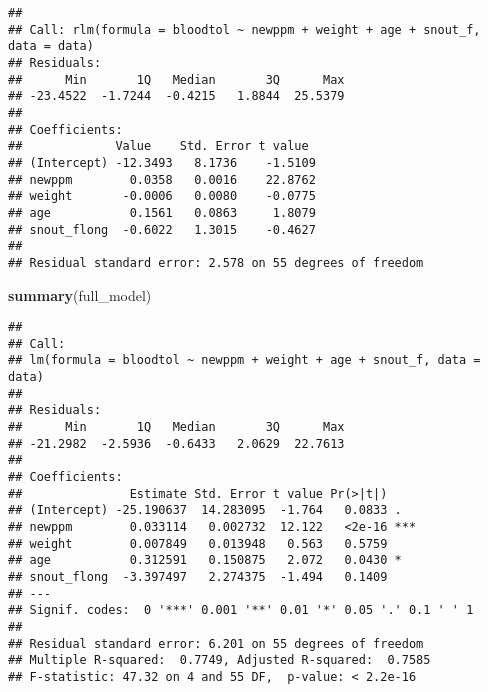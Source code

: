 \documentclass[
]{article}
\newenvironment{Shaded}{\begin{snugshade}}{\end{snugshade}}
\newcommand{\AttributeTok}[1]{\textcolor[rgb]{0.13,0.29,0.53}{#1}}
\newcommand{\CommentTok}[1]{\textcolor[rgb]{0.56,0.35,0.01}{\textit{#1}}}
\newcommand{\FunctionTok}[1]{\textcolor[rgb]{0.13,0.29,0.53}{\textbf{#1}}}
\newcommand{\NormalTok}[1]{#1}
\newcommand{\OtherTok}[1]{\textcolor[rgb]{0.56,0.35,0.01}{#1}}
\newcommand{\SpecialCharTok}[1]{\textcolor[rgb]{0.81,0.36,0.00}{\textbf{#1}}}
\newcommand{\StringTok}[1]{\textcolor[rgb]{0.31,0.60,0.02}{#1}}
\begin{document}
\begin{verbatim}
## 
## Call: rlm(formula = bloodtol ~ newppm + weight + age + snout_f, data = data)
## Residuals:
##      Min       1Q   Median       3Q      Max 
## -23.4522  -1.7244  -0.4215   1.8844  25.5379 
## 
## Coefficients:
##             Value    Std. Error t value 
## (Intercept) -12.3493   8.1736    -1.5109
## newppm        0.0358   0.0016    22.8762
## weight       -0.0006   0.0080    -0.0775
## age           0.1561   0.0863     1.8079
## snout_flong  -0.6022   1.3015    -0.4627
## 
## Residual standard error: 2.578 on 55 degrees of freedom
\end{verbatim}

\begin{Shaded}
\begin{Highlighting}[]
\FunctionTok{summary}\NormalTok{(full\_model)}
\end{Highlighting}
\end{Shaded}

\begin{verbatim}
## 
## Call:
## lm(formula = bloodtol ~ newppm + weight + age + snout_f, data = data)
## 
## Residuals:
##      Min       1Q   Median       3Q      Max 
## -21.2982  -2.5936  -0.6433   2.0629  22.7613 
## 
## Coefficients:
##               Estimate Std. Error t value Pr(>|t|)    
## (Intercept) -25.190637  14.283095  -1.764   0.0833 .  
## newppm        0.033114   0.002732  12.122   <2e-16 ***
## weight        0.007849   0.013948   0.563   0.5759    
## age           0.312591   0.150875   2.072   0.0430 *  
## snout_flong  -3.397497   2.274375  -1.494   0.1409    
## ---
## Signif. codes:  0 '***' 0.001 '**' 0.01 '*' 0.05 '.' 0.1 ' ' 1
## 
## Residual standard error: 6.201 on 55 degrees of freedom
## Multiple R-squared:  0.7749, Adjusted R-squared:  0.7585 
## F-statistic: 47.32 on 4 and 55 DF,  p-value: < 2.2e-16
\end{verbatim}

\begin{Shaded}
\end{Shaded}
\end{document}
